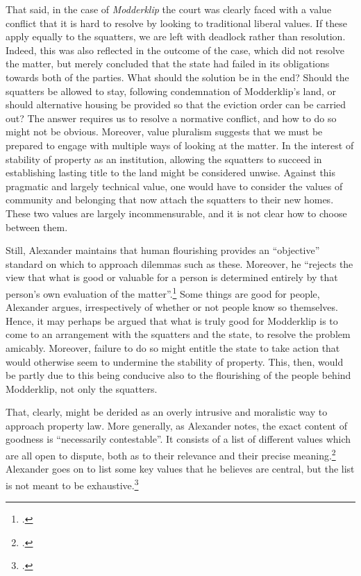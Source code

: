\documentclass[12pt,a4paper]{book} %
\begin{document}
That said, in the case of {\it Modderklip} the court was clearly faced with a value conflict that it is hard to resolve by looking to traditional liberal values. If these apply equally to the squatters, we are left with deadlock rather than resolution. Indeed, this was also reflected in the outcome of the case, which did not resolve the matter, but merely concluded that the state had failed in its obligations towards both of the parties. What should the solution be in the end? Should the squatters be allowed to stay, following condemnation of Modderklip's land, or should alternative housing be provided so that the eviction order can be carried out? The answer requires us to resolve a normative conflict, and how to do so might not be obvious. Moreover, value pluralism suggests that we must be prepared to engage with multiple ways of looking at the matter. In the interest of stability of property as an institution, allowing the squatters to succeed in establishing lasting title to the land might be considered unwise. Against this pragmatic and largely technical value, one would have to consider the values of community and belonging that now attach the squatters to their new homes. These two values are largely incommensurable, and it is not clear how to choose between them.

Still, Alexander maintains that human flourishing provides an ``objective'' standard on which to approach dilemmas such as these. Moreover, he ``rejects the view that what is good or valuable for a person is determined entirely by that person's own evaluation of the matter''.\footcite[1263]{alexander14} Some things are good for people, Alexander argues, irrespectively of whether or not people know so themselves. Hence, it may perhaps be argued that what is truly good for Modderklip is to come to an arrangement with the squatters and the state, to resolve the problem amicably. Moreover, failure to do so might entitle the state to take action that would otherwise seem to undermine the stability of property. This, then, would be partly due to this being conducive also to the flourishing of the people behind Modderklip, not only the squatters.

That, clearly, might be derided as an overly intrusive and moralistic way to approach property law. More generally, as Alexander notes, the exact content of goodness is ``necessarily contestable''. It consists of a list of different values which are all open to dispute, both as to their relevance and their precise meaning.\footcite[1263]{alexander14} Alexander goes on to list some key values that he believes are central, but the list is not meant to be exhaustive.\footcite[1764-1776]{alexander14}
\end{document}
